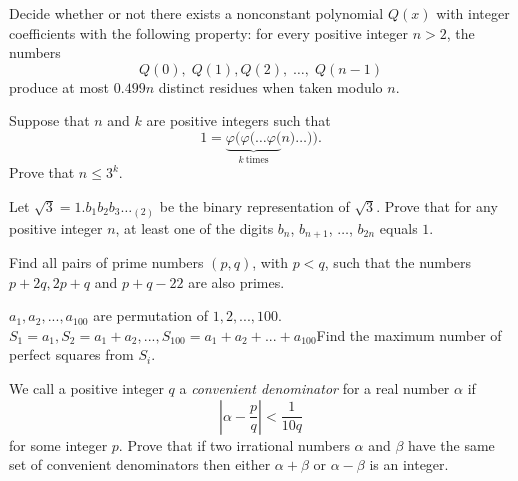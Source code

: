 \documentclass[problems.tex]{subfile}
\begin{document}
	\begin{problem}
		Decide whether or not there exists a nonconstant polynomial $Q(x)$ with integer coefficients with the following property: for every positive integer $n > 2$, the numbers \[ Q(0), \; Q(1), Q(2), \; \dots, \; Q(n-1) \]produce at most $0.499n$ distinct residues when taken modulo $n$. %
	\end{problem}

	\begin{problem}
		Suppose that $n$ and $k$ are positive integers such that \[ 1 = \underbrace{\varphi( \varphi( \dots \varphi(}_{k\ \text{times}} n) \dots )). \]Prove that $n \le 3^k$. %
	\end{problem}

	\begin{problem}
		Let $\sqrt 3 = 1.b_1b_2b_3 \dots _{(2)}$ be the binary representation of $\sqrt 3$. Prove that for any positive integer $n$, at least one of the digits $b_n$, $b_{n+1}$, $\dots$, $b_{2n}$ equals $1$. %
	\end{problem}

	\begin{problem}
		Find all pairs of prime numbers $(p, q)$, with $p <q$, such that the numbers $p + 2q, 2p + q$ and $p + q - 22$ are also primes.
	\end{problem}

	\begin{problem}
		$a_1,a_2,...,a_{100}$ are permutation of $1,2,...,100$. $S_1=a_1, S_2=a_1+a_2,...,S_{100}=a_1+a_2+...+a_{100}$Find the maximum number of perfect squares from $S_i$. %
	\end{problem}

	\begin{problem}
		We call a positive integer $q$ a \textit{convenient denominator} for a real number $\alpha$ if
		$$ \left|\alpha - \dfrac{p}{q}\right|<\dfrac{1}{10q}$$ for some integer $p$. Prove that if two irrational numbers $\alpha$ and
		$\beta$ have the same set of convenient denominators then either $\alpha+\beta$ or $\alpha- \beta$ is an integer\watermark. %
	\end{problem}
\end{document}
